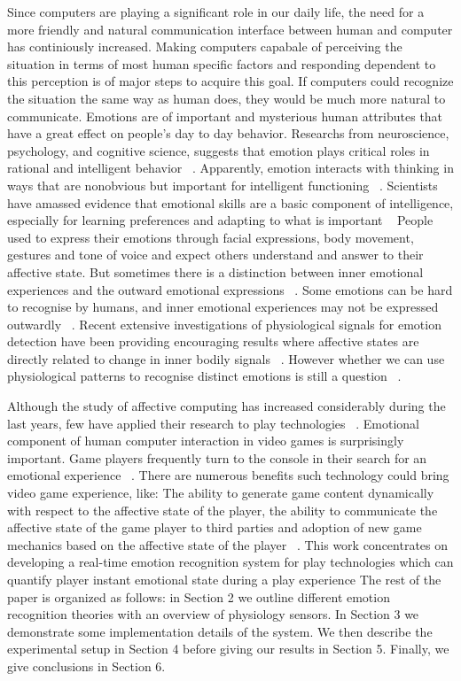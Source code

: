 \documentclass{uofsthesis-cs}
\begin{document}
Since computers are playing a significant role in our daily life, the need for a more friendly and natural communication interface between human and computer has continiously increased. Making computers capabale of perceiving the situation in terms of most human specific factors and responding dependent to this perception is of major steps to acquire this goal. If computers could recognize the situation the same way as human does, they would be much more natural to communicate. Emotions are of important and mysterious human attributes that have a great effect on people's day to day behavior. Researchs from neuroscience, psychology, and cognitive science, suggests that emotion plays critical roles in rational and intelligent behavior ~\cite{picard2001toward}. Apparently, emotion interacts with thinking in ways that are nonobvious but important for intelligent functioning ~\cite{picard2001toward}. Scientists have amassed evidence that emotional skills are a basic component of intelligence, especially for learning preferences and adapting to what is important ~\cite{mayer1993intelligence, goleman2006emotional} People used to express their emotions through facial expressions, body movement, gestures and tone of voice and expect others understand and answer to their affective state. But sometimes there is a distinction between inner emotional experiences and the outward emotional expressions ~\cite{picard2003affective}. Some emotions can be hard to recognise by humans, and inner emotional experiences may not be expressed outwardly ~\cite{jones2007biometric}. Recent extensive investigations of physiological signals for emotion detection have been providing encouraging results where affective states are directly related to change in inner bodily signals ~\cite{jones2007biometric}. However whether we can use physiological patterns to recognise distinct emotions is still a question ~\cite{picard2001toward, cacioppo1990inferring}.

Although the study of affective computing has increased considerably during the last years, few have applied their research to play technologies ~\cite{sykes2003affective}. Emotional component of human computer interaction in video games is surprisingly important. Game players frequently turn to the console in their search for an emotional experience ~\cite{rouse2010game}. There are numerous benefits such technology could bring video game experience, like: The ability to generate game content dynamically with respect to the affective state of the player, the ability to communicate the affective state of the game player to third parties and adoption of new game mechanics based on the affective state of the player ~\cite{sykes2003affective}. This work concentrates on developing a real-time emotion recognition system for play technologies which can quantify player instant emotional state during a play experience The rest of the paper is organized as follows: in Section 2 we outline different emotion recognition theories with an overview of physiology sensors. In Section 3 we demonstrate some implementation details of the system. We then describe the experimental setup in Section 4 before giving our results in Section 5. Finally, we give conclusions in Section 6.
\end{document}
